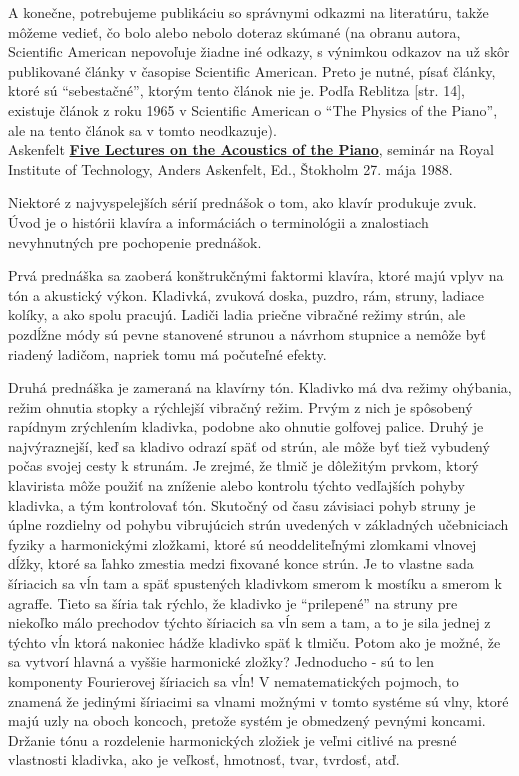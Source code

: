 \documentclass[11pt,a4paper]{book}
\begin{document}
A konečne, potrebujeme publikáciu so správnymi odkazmi na literatúru, takže môžeme vedieť, čo bolo alebo nebolo doteraz skúmané (na obranu autora, Scientific American nepovoľuje žiadne iné odkazy, s výnimkou odkazov na už skôr publikované články v časopise Scientific American. Preto je nutné, písať články, ktoré sú “sebestačné”, ktorým tento článok nie je. Podľa Reblitza [str. 14], existuje článok z roku 1965 v Scientific American o “The Physics of the Piano”, ale na tento článok sa v tomto neodkazuje). 
\medskip\\
\hypertarget{r:askenfelt}{Askenfelt} \textbf{\href{http://www.speech.kth.se/music/5_lectures/contents.html}{Five Lectures on the Acoustics of the Piano}}, seminár na Royal Institute of Technology, Anders Askenfelt, Ed., Štokholm 27. mája 1988. 

Niektoré z najvyspelejších sérií prednášok o tom, ako klavír produkuje zvuk. Úvod je o histórii klavíra a informáciách o terminológii a znalostiach nevyhnutných pre pochopenie prednášok. 

Prvá prednáška sa zaoberá konštrukčnými faktormi klavíra, ktoré majú vplyv na tón a akustický výkon. Kladivká, zvuková doska, puzdro, rám, struny, ladiace kolíky, a ako spolu pracujú. Ladiči ladia priečne vibračné režimy strún, ale pozdĺžne módy sú pevne stanovené strunou a návrhom stupnice a nemôže byť riadený ladičom, napriek tomu má počuteľné efekty. 

Druhá prednáška je zameraná na klavírny tón. Kladivko má dva režimy ohýbania, režim ohnutia stopky a rýchlejší vibračný režim. Prvým z nich je spôsobený rapídnym zrýchlením kladivka, podobne ako ohnutie golfovej palice. Druhý je najvýraznejší, keď sa kladivo odrazí späť od strún, ale môže byť tiež vybudený počas svojej cesty k strunám. Je zrejmé, že tlmič je dôležitým prvkom, ktorý klavirista môže použiť na zníženie alebo kontrolu týchto vedľajších pohyby kladivka, a tým kontrolovať tón. Skutočný od času závisiaci pohyb struny je úplne rozdielny od pohybu vibrujúcich strún uvedených v základných učebniciach fyziky a harmonickými zložkami, ktoré sú neoddeliteľnými zlomkami vlnovej dĺžky, ktoré sa ľahko zmestia medzi fixované konce strún. Je to vlastne sada šíriacich sa vĺn tam a späť spustených kladivkom smerom k mostíku a smerom k agraffe. Tieto sa šíria tak rýchlo, že kladivko je “prilepené” na struny pre niekoľko málo prechodov týchto šíriacich sa vĺn sem a tam, a to je sila jednej z týchto vĺn ktorá nakoniec hádže kladivko späť k tlmiču. Potom ako je možné, že sa vytvorí hlavná a vyššie harmonické zložky? Jednoducho - sú to len komponenty Fourierovej šíriacich sa vĺn! V nematematických pojmoch, to znamená že jedinými šíriacimi sa vlnami možnými v tomto systéme sú vlny, ktoré majú uzly na oboch koncoch, pretože systém je obmedzený pevnými koncami. Držanie tónu a rozdelenie harmonických zložiek je veľmi citlivé na presné vlastnosti kladivka, ako je veľkosť, hmotnosť, tvar, tvrdosť, atď. 
\end{document}
